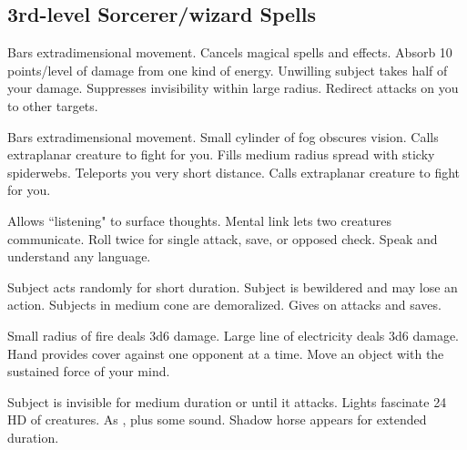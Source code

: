 \subsection{3rd-level Sorcerer/wizard Spells} 
\begin{swspelllist}
 Bars extradimensional movement.
 Cancels magical spells and effects.
 Absorb 10 points/level of damage from one kind of energy.
 Unwilling subject takes half of your damage.
 Suppresses invisibility within large radius.
 Redirect attacks on you to other targets.

 Bars extradimensional movement.
 Small cylinder of fog obscures vision.
 Calls extraplanar creature to fight for you.
 Fills medium radius spread with sticky spiderwebs.
 Teleports you very short distance.
 Calls extraplanar creature to fight for you.

 Allows ``listening" to surface thoughts.
 Mental link lets two creatures communicate.
 Roll twice for single attack, save, or opposed check.
 Speak and understand any language.

 Subject acts randomly for short duration.
 Subject is bewildered and may lose an action.
 Subjects in medium cone are demoralized.
 Gives  on attacks and saves.

 Small radius of fire deals 3d6 damage.
 Large line of electricity deals 3d6 damage.
 Hand provides cover against one opponent at a time.
 Move an object with the sustained force of your mind.

 Subject is invisible for medium duration or until it attacks.
 Lights fascinate 24 HD of creatures.
 As , plus some sound.
 Shadow horse appears for extended duration.


\end{swspelllist}
